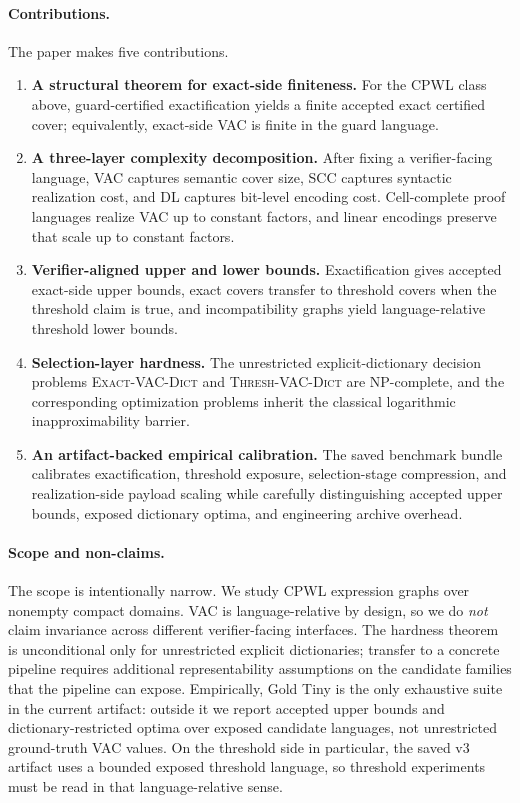 \documentclass{article}
\begin{document}
\paragraph{Contributions.}
The paper makes five contributions.
\begin{enumerate}
    \item \textbf{A structural theorem for exact-side finiteness.} For the CPWL class above, guard-certified exactification yields a finite accepted exact certified cover; equivalently, exact-side VAC is finite in the guard language.
    \item \textbf{A three-layer complexity decomposition.} After fixing a verifier-facing language, VAC captures semantic cover size, SCC captures syntactic realization cost, and DL captures bit-level encoding cost. Cell-complete proof languages realize VAC up to constant factors, and linear encodings preserve that scale up to constant factors.
    \item \textbf{Verifier-aligned upper and lower bounds.} Exactification gives accepted exact-side upper bounds, exact covers transfer to threshold covers when the threshold claim is true, and incompatibility graphs yield language-relative threshold lower bounds.
    \item \textbf{Selection-layer hardness.} The unrestricted explicit-dictionary decision problems \textsc{Exact-VAC-Dict} and \textsc{Thresh-VAC-Dict} are NP-complete, and the corresponding optimization problems inherit the classical logarithmic inapproximability barrier.
    \item \textbf{An artifact-backed empirical calibration.} The saved benchmark bundle calibrates exactification, threshold exposure, selection-stage compression, and realization-side payload scaling while carefully distinguishing accepted upper bounds, exposed dictionary optima, and engineering archive overhead.
\end{enumerate}

\paragraph{Scope and non-claims.}
The scope is intentionally narrow. We study CPWL expression graphs over nonempty compact domains. VAC is language-relative by design, so we do \emph{not} claim invariance across different verifier-facing interfaces. The hardness theorem is unconditional only for unrestricted explicit dictionaries; transfer to a concrete pipeline requires additional representability assumptions on the candidate families that the pipeline can expose. Empirically, Gold Tiny is the only exhaustive suite in the current artifact: outside it we report accepted upper bounds and dictionary-restricted optima over exposed candidate languages, not unrestricted ground-truth VAC values. On the threshold side in particular, the saved v3 artifact uses a bounded exposed threshold language, so threshold experiments must be read in that language-relative sense.
\end{document}
